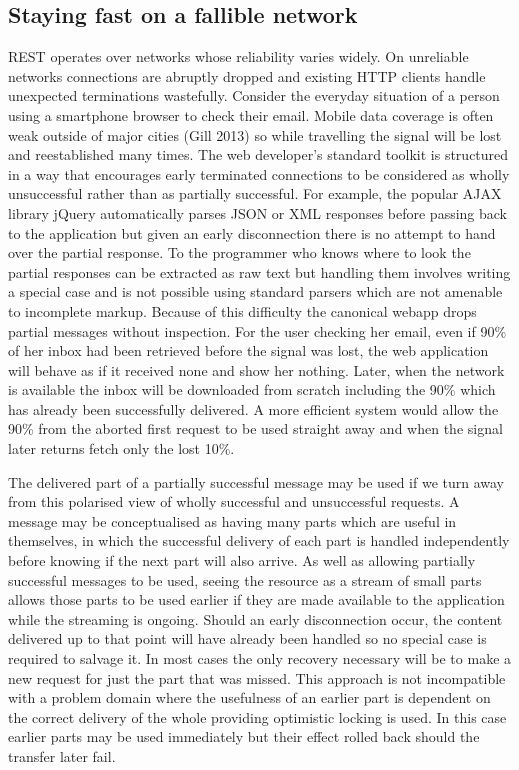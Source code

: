 \documentclass[12pt, ]{article}
\begin{document}
\subsection{Staying fast on a fallible
network}\label{staying-fast-on-a-fallible-network}

REST operates over networks whose reliability varies widely. On
unreliable networks connections are abruptly dropped and existing HTTP
clients handle unexpected terminations wastefully. Consider the everyday
situation of a person using a smartphone browser to check their email.
Mobile data coverage is often weak outside of major cities (Gill 2013)
so while travelling the signal will be lost and reestablished many
times. The web developer's standard toolkit is structured in a way that
encourages early terminated connections to be considered as wholly
unsuccessful rather than as partially successful. For example, the
popular AJAX library jQuery automatically parses JSON or XML responses
before passing back to the application but given an early disconnection
there is no attempt to hand over the partial response. To the programmer
who knows where to look the partial responses can be extracted as raw
text but handling them involves writing a special case and is not
possible using standard parsers which are not amenable to incomplete
markup. Because of this difficulty the canonical webapp drops partial
messages without inspection. For the user checking her email, even if
90\% of her inbox had been retrieved before the signal was lost, the web
application will behave as if it received none and show her nothing.
Later, when the network is available the inbox will be downloaded from
scratch including the 90\% which has already been successfully
delivered. A more efficient system would allow the 90\% from the aborted
first request to be used straight away and when the signal later returns
fetch only the lost 10\%.

The delivered part of a partially successful message may be used if we
turn away from this polarised view of wholly successful and unsuccessful
requests. A message may be conceptualised as having many parts which are
useful in themselves, in which the successful delivery of each part is
handled independently before knowing if the next part will also arrive.
As well as allowing partially successful messages to be used, seeing the
resource as a stream of small parts allows those parts to be used
earlier if they are made available to the application while the
streaming is ongoing. Should an early disconnection occur, the content
delivered up to that point will have already been handled so no special
case is required to salvage it. In most cases the only recovery
necessary will be to make a new request for just the part that was
missed. This approach is not incompatible with a problem domain where
the usefulness of an earlier part is dependent on the correct delivery
of the whole providing optimistic locking is used. In this case earlier
parts may be used immediately but their effect rolled back should the
transfer later fail.
\end{document}

